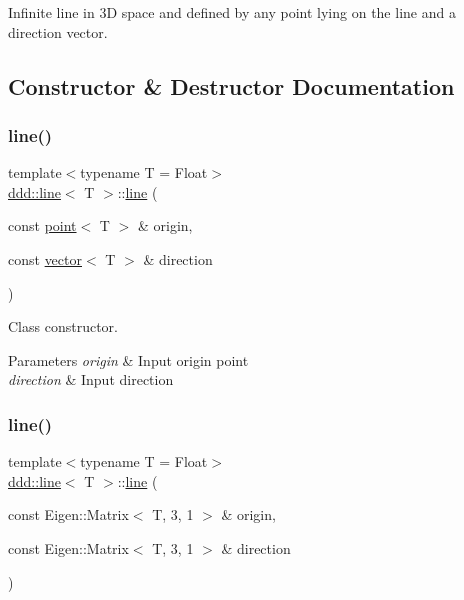 Infinite line in 3D space and defined by any point lying on the line and a direction vector. 

\subsection{Constructor \& Destructor Documentation}
\mbox{\label{classddd_1_1line_a8499fa13ffea06de1705c05f742e0f5c}} 
\subsubsection{\texorpdfstring{line()}{line()}\hspace{0.1cm}{\footnotesize\ttfamily [1/2]}}
{\footnotesize\ttfamily template$<$typename T = Float$>$ \\
\hyperlink{classddd_1_1line}{ddd\+::line}$<$ T $>$\+::\hyperlink{classddd_1_1line}{line} (\begin{DoxyParamCaption}\item[{const \hyperlink{classddd_1_1point}{point}$<$ T $>$ \&}]{origin,  }\item[{const \hyperlink{classddd_1_1vector}{vector}$<$ T $>$ \&}]{direction }\end{DoxyParamCaption})\hspace{0.3cm}{\ttfamily [inline]}}



Class constructor. 


\begin{DoxyParams}{Parameters}
{\em origin} & Input origin point \\
\hline
{\em direction} & Input direction \\
\hline
\end{DoxyParams}
\mbox{\label{classddd_1_1line_aef2bb8b4dcdf78f86c8e178ddd483eab}} 
\subsubsection{\texorpdfstring{line()}{line()}\hspace{0.1cm}{\footnotesize\ttfamily [2/2]}}
{\footnotesize\ttfamily template$<$typename T = Float$>$ \\
\hyperlink{classddd_1_1line}{ddd\+::line}$<$ T $>$\+::\hyperlink{classddd_1_1line}{line} (\begin{DoxyParamCaption}\item[{const Eigen\+::\+Matrix$<$ T, 3, 1 $>$ \&}]{origin,  }\item[{const Eigen\+::\+Matrix$<$ T, 3, 1 $>$ \&}]{direction }\end{DoxyParamCaption})\hspace{0.3cm}{\ttfamily [inline]}}



